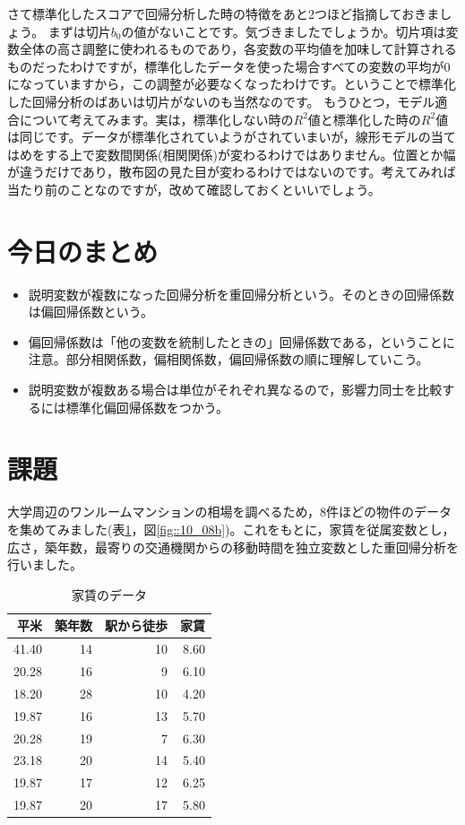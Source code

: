 \documentclass{ltjbook}
\begin{document}
さて標準化したスコアで回帰分析した時の特徴をあと2つほど指摘しておきましょう。
まずは切片$b_0$の値がないことです。気づきましたでしょうか。切片項は変数全体の高さ調整に使われるものであり，各変数の平均値を加味して計算されるものだったわけですが，標準化したデータを使った場合すべての変数の平均が0になっていますから，この調整が必要なくなったわけです。ということで標準化した回帰分析のばあいは切片がないのも当然なのです。
もうひとつ，モデル適合について考えてみます。実は，標準化しない時の$R^2$値と標準化した時の$R^2$値は同じです。データが標準化されていようがされていまいが，線形モデルの当てはめをする上で変数間関係(相関関係)が変わるわけではありません。位置とか幅が違うだけであり，散布図の見た目が変わるわけではないのです。考えてみれば当たり前のことなのですが，改めて確認しておくといいでしょう。


\section{今日のまとめ}
\begin{itemize}
	\item 説明変数が複数になった回帰分析を重回帰分析という。そのときの回帰係数は偏回帰係数という。
	\item 偏回帰係数は「他の変数を統制したときの」回帰係数である，ということに注意。部分相関係数，偏相関係数，偏回帰係数の順に理解していこう。
	\item 説明変数が複数ある場合は単位がそれぞれ異なるので，影響力同士を比較するには標準化偏回帰係数をつかう。
\end{itemize}

\section{課題}

大学周辺のワンルームマンションの相場を調べるため，8件ほどの物件のデータを集めてみました(表\ref{tab:ex11_01}，図\ref{fig::10_08b})。これをもとに，家賃を従属変数とし，広さ，築年数，最寄りの交通機関からの移動時間を独立変数とした重回帰分析を行いました。

\begin{table}[ht]
	\caption{家賃のデータ}
	\label{tab:ex11_01}
	\centering
	\begin{tabular}[t]{rrrr}
		\hline
		平米    & 築年数 & 駅から徒歩 & 家賃   \\\hline
		41.40 & 14  & 10    & 8.60 \\
		20.28 & 16  & 9     & 6.10 \\
		18.20 & 28  & 10    & 4.20 \\
		19.87 & 16  & 13    & 5.70 \\
		20.28 & 19  & 7     & 6.30 \\
		23.18 & 20  & 14    & 5.40 \\
		19.87 & 17  & 12    & 6.25 \\
		19.87 & 20  & 17    & 5.80 \\
		\hline
	\end{tabular}
\end{table}
\end{document}
